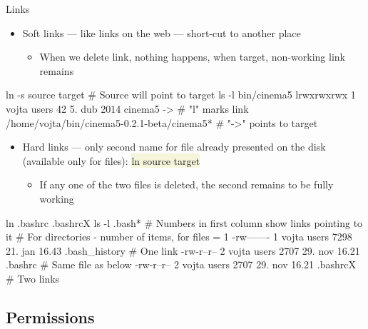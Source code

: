\documentclass[compress, ucs, xelatex, 11pt, xcolor=svgnames, aspectratio=169,
	hyperref={
		bookmarks=true,
		unicode=true,
		colorlinks=true,
		pdftitle={Linux, command line and MetaCentrum},
		plainpages=false,
		pdfauthor={Vojtech Zeisek},
		pdfsubject={Course about use of Linux command line, writing shell scripts and using MetaCentrum of CESNET},
		pdfcreator={XeLaTeX},
		pdfkeywords={Linux, GNU, BASH, shell, command line, MetaCentrum},
		linkcolor=DarkRed, %
		anchorcolor=DarkBlue, %
		citecolor=Indigo, %
		filecolor=NavyBlue, %
		menucolor=DarkMagenta, %
		urlcolor=DarkBlue, %
		pdftex},
	url={hyphens, lowtilde} %
	]{beamer}
\renewcommand{\texttt}[1]{\colorbox{Beige}{{\ttfamily #1}}}
\begin{document}
\begin{frame}[fragile]{Links}
	\label{links}
	\begin{itemize}
		\item Soft links --- like links on the web --- short-cut to another place
		\begin{itemize}
			\item When we delete link, nothing happens, when target, non-working link remains
		\end{itemize}
	\end{itemize}
	\vfill
	\begin{bashcode}
    ln -s source target # Source will point to target
    ls -l bin/cinema5
    lrwxrwxrwx 1 vojta users 42 5. dub 2014 cinema5 -> # "l" marks link
      /home/vojta/bin/cinema5-0.2.1-beta/cinema5* # "->" points to target
	\end{bashcode}
	\vfill
	\begin{itemize}
		\item Hard links --- only second name for file already presented on the disk (available only for files): \texttt{ln source target}
		\begin{itemize}
			\item If any one of the two files is deleted, the second remains to be fully working
		\end{itemize}
	\end{itemize}
	\vfill
	\begin{bashcode}
    ln .bashrc .bashrcX
    ls -l .bash* # Numbers in first column show links pointing to it
                 # For directories - number of items, for files = 1
    -rw------- 1 vojta users 7298 21. jan 16.43 .bash_history # One link
    -rw-r--r-- 2 vojta users 2707 29. nov 16.21 .bashrc # Same file as below
    -rw-r--r-- 2 vojta users 2707 29. nov 16.21 .bashrcX # Two links
	\end{bashcode}
\end{frame}

\subsection{Permissions}
\end{document}
